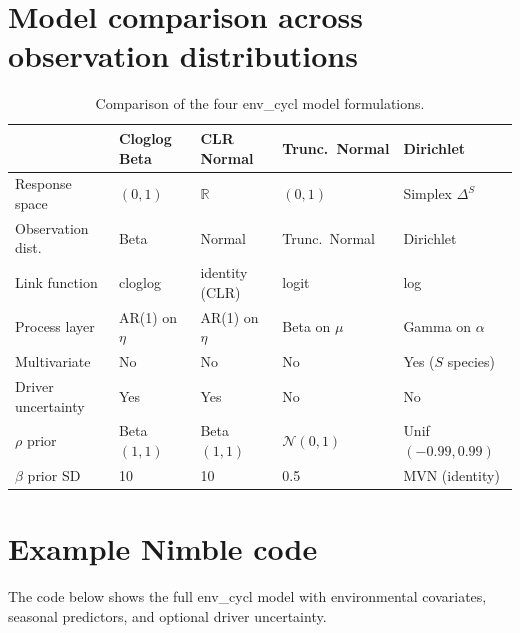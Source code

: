 \documentclass[11pt]{article}
\begin{document}
\section{Model comparison across observation distributions}

\begin{table}[ht]
\centering
\small
\begin{tabular}{@{}lllll@{}}
\toprule
& \textbf{Cloglog Beta} & \textbf{CLR Normal} & \textbf{Trunc.\ Normal} & \textbf{Dirichlet} \\
\midrule
Response space & $(0,1)$ & $\mathbb{R}$ & $(0,1)$ & Simplex $\Delta^S$ \\
Observation dist. & Beta & Normal & Trunc.\ Normal & Dirichlet \\
Link function & cloglog & identity (CLR) & logit & log \\
Process layer & AR(1) on $\eta$ & AR(1) on $\eta$ & Beta on $\mu$ & Gamma on $\alpha$ \\
Multivariate & No & No & No & Yes ($S$ species) \\
Driver uncertainty & Yes & Yes & No & No \\
$\rho$ prior & Beta$(1,1)$ & Beta$(1,1)$ & $\mathcal{N}(0,1)$ & Unif$(-0.99, 0.99)$ \\
$\beta$ prior SD & 10 & 10 & 0.5 & MVN (identity) \\
\bottomrule
\end{tabular}
\caption{Comparison of the four env\_cycl model formulations.}
\label{tab:comparison}
\end{table}


\section{Example Nimble code}

The code below shows the full env\_cycl model with environmental covariates, seasonal predictors, and optional driver uncertainty.
\end{document}
